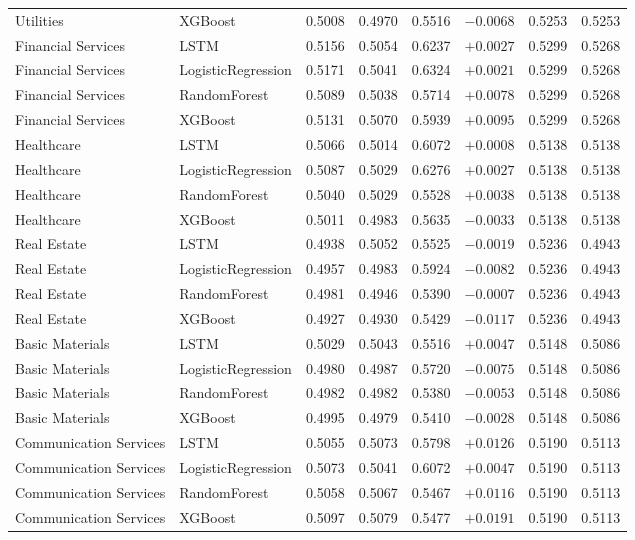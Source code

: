 \begin{longtable}{llrrrrrr}
Utilities & XGBoost & 0.5008 & 0.4970 & 0.5516 & $-0.0068$ & 0.5253 & 0.5253 \\
Financial Services & LSTM & 0.5156 & 0.5054 & 0.6237 & $+0.0027$ & 0.5299 & 0.5268 \\
Financial Services & LogisticRegression & 0.5171 & 0.5041 & 0.6324 & $+0.0021$ & 0.5299 & 0.5268 \\
Financial Services & RandomForest & 0.5089 & 0.5038 & 0.5714 & $+0.0078$ & 0.5299 & 0.5268 \\
Financial Services & XGBoost & 0.5131 & 0.5070 & 0.5939 & $+0.0095$ & 0.5299 & 0.5268 \\
Healthcare & LSTM & 0.5066 & 0.5014 & 0.6072 & $+0.0008$ & 0.5138 & 0.5138 \\
Healthcare & LogisticRegression & 0.5087 & 0.5029 & 0.6276 & $+0.0027$ & 0.5138 & 0.5138 \\
Healthcare & RandomForest & 0.5040 & 0.5029 & 0.5528 & $+0.0038$ & 0.5138 & 0.5138 \\
Healthcare & XGBoost & 0.5011 & 0.4983 & 0.5635 & $-0.0033$ & 0.5138 & 0.5138 \\
Real Estate & LSTM & 0.4938 & 0.5052 & 0.5525 & $-0.0019$ & 0.5236 & 0.4943 \\
Real Estate & LogisticRegression & 0.4957 & 0.4983 & 0.5924 & $-0.0082$ & 0.5236 & 0.4943 \\
Real Estate & RandomForest & 0.4981 & 0.4946 & 0.5390 & $-0.0007$ & 0.5236 & 0.4943 \\
Real Estate & XGBoost & 0.4927 & 0.4930 & 0.5429 & $-0.0117$ & 0.5236 & 0.4943 \\
Basic Materials & LSTM & 0.5029 & 0.5043 & 0.5516 & $+0.0047$ & 0.5148 & 0.5086 \\
Basic Materials & LogisticRegression & 0.4980 & 0.4987 & 0.5720 & $-0.0075$ & 0.5148 & 0.5086 \\
Basic Materials & RandomForest & 0.4982 & 0.4982 & 0.5380 & $-0.0053$ & 0.5148 & 0.5086 \\
Basic Materials & XGBoost & 0.4995 & 0.4979 & 0.5410 & $-0.0028$ & 0.5148 & 0.5086 \\
Communication Services & LSTM & 0.5055 & 0.5073 & 0.5798 & $+0.0126$ & 0.5190 & 0.5113 \\
Communication Services & LogisticRegression & 0.5073 & 0.5041 & 0.6072 & $+0.0047$ & 0.5190 & 0.5113 \\
Communication Services & RandomForest & 0.5058 & 0.5067 & 0.5467 & $+0.0116$ & 0.5190 & 0.5113 \\
Communication Services & XGBoost & 0.5097 & 0.5079 & 0.5477 & $+0.0191$ & 0.5190 & 0.5113 \\

\end{longtable}
